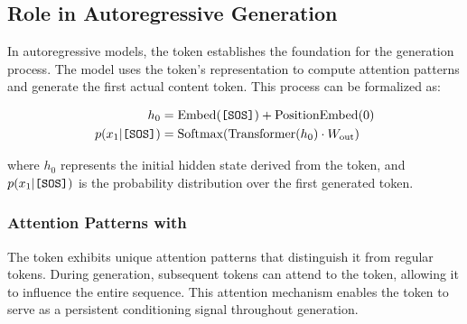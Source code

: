 \subsection{Role in Autoregressive Generation}

In autoregressive models, the \sos{} token establishes the foundation for the generation process. The model uses the \sos{} token's representation to compute attention patterns and generate the first actual content token. This process can be formalized as:

\begin{align}
h_0 &= \text{Embed}(\text{\texttt{[SOS]}{}}) + \text{PositionEmbed}(0) \\
p(x_1 | \text{\texttt{[SOS]}{}}) &= \text{Softmax}(\text{Transformer}(h_0) \cdot W_{\text{out}})
\end{align}

where $h_0$ represents the initial hidden state derived from the \sos{} token, and $p(x_1 | \text{\texttt{[SOS]}{}})$ is the probability distribution over the first generated token.

\subsubsection{Attention Patterns with \sos{}}

The \sos{} token exhibits unique attention patterns that distinguish it from regular tokens. During generation, subsequent tokens can attend to the \sos{} token, allowing it to influence the entire sequence. This attention mechanism enables the \sos{} token to serve as a persistent conditioning signal throughout generation.

